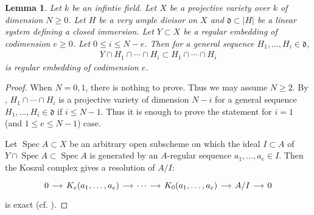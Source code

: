 \documentclass[12pt]{amsart}
\theoremstyle{plain}
\newtheorem{lemma}[theorem]{Lemma}
\theoremstyle{definition}
\numberwithin{equation}{section}
\def\dd{{ \mathfrak{d}}}
\DeclareMathOperator{\Spec}{Spec}
\begin{document}
\begin{lemma}\label{lem:hpcutregemb}
Let $k$ be an infintie field.
Let $X$ be a projective variety over $k$ of dimension $N \geq 0$.
Let $H$ be a very ample divisor on $X$ and $ \mathfrak{d} \subset |H|$ be a linear system 
defining a closed immersion.
Let $Y \subset X$ be a regular embedding of codimension $e \geq 0$.
Let $0 \leq i \leq N-e$.
Then for a general sequence $H_{1},\dots , H_{i} \in \mathfrak{d}$,
\begin{align}
Y \cap H_{1} \cap \cdots \cap H_{i} \subset  H_{1} \cap \cdots \cap H_{i} 
\end{align}
is regular embedding of codimension $e$.
\end{lemma}
\begin{proof}
When $N = 0,1$, there is nothing to prove.
Thus we may assume $N \geq 2$.
By \cite[(3.4.10), Corollary 3.4.14]{joinintersec}, $H_{1} \cap \cdots \cap H_{i}$
is a projective variety of dimension $N-i$ for a general sequence $H_{1}, \dots, H_{i} \in \dd$
if $i \leq N-1$.
Thus it is enough to prove the statement for $i = 1$ (and $1 \leq  e \leq N-1$) case.

Let $\Spec A \subset X$ be an arbitrary open subscheme
on which the ideal $I \subset A$ of $Y \cap \Spec A \subset \Spec A$
is generated by an $A$-regular sequence $a_{1},\dots, a_{e} \in I$.
Then the Koszul complex gives a resolution of $A/I$:
\begin{equation}
\begin{tikzcd}[column sep=small]
0 \arrow[r] & K_{e}(a_{1},\dots,a_{e}) \arrow[r] & \cdots \arrow[r] &  K_{0}(a_{1},\dots,a_{e}) \arrow[r] &  A/I \arrow[r] & 0 \label{eq:koszulresol}
\end{tikzcd}
\end{equation}
is exact (cf.  \cite[Theorem 16.5]{MatRing}).


\end{proof}
\end{document}
